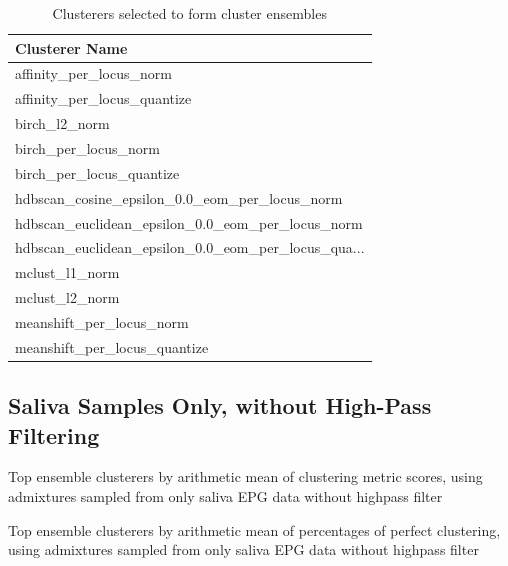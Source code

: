\begin{table}
\centering
\begin{tabular}{l}
\toprule
                                    Clusterer Name \\
\midrule
                           affinity\_per\_locus\_norm \\
                       affinity\_per\_locus\_quantize \\
                                     birch\_l2\_norm \\
                              birch\_per\_locus\_norm \\
                          birch\_per\_locus\_quantize \\
     hdbscan\_cosine\_epsilon\_0.0\_eom\_per\_locus\_norm \\
  hdbscan\_euclidean\_epsilon\_0.0\_eom\_per\_locus\_norm \\
hdbscan\_euclidean\_epsilon\_0.0\_eom\_per\_locus\_qua... \\
                                    mclust\_l1\_norm \\
                                    mclust\_l2\_norm \\
                          meanshift\_per\_locus\_norm \\
                      meanshift\_per\_locus\_quantize \\
\bottomrule
\end{tabular}
\caption{Clusterers selected to form cluster ensembles}
\label{table:Clusterers selected to form cluster ensembles}
\end{table}

\subsection{Saliva Samples Only, without High-Pass Filtering}

\begin{table}[H]
\centering
{}
\caption{Top ensemble clusterers by arithmetic mean of clustering metric scores, using admixtures sampled from only saliva EPG data without highpass filter}
\label{table:top_ensemble_clusterers_by_metrics_highpass_0-sampleids_saliva-nruns_1000}
\end{table}

\begin{table}[H]
\centering
{}
\caption{Top ensemble clusterers by arithmetic mean of percentages of perfect clustering, using admixtures sampled from only saliva EPG data without highpass filter}
\label{table:top_ensemble_clusterers_by_binomial_confidence_highpass_0-sampleids_saliva-nruns_1000}
\end{table}

